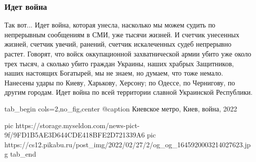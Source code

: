  
 
 
 
 

\subsubsection{Идет война}

Так вот... Идет война, которая унесла, насколько мы можем судить по непрерывным
сообщениям в СМИ, уже тысячи жизней. И счетчик унесенных жизней, счетчик
увечий, ранений, счетчик искалеченных судеб непрерывно растет. Говорят, что
войск оккупационной захватнической армии убито уже около трех тысяч, а сколько
убито граждан Украины, наших храбрых Защитников, наших настоящих Богатырей, мы
не знаем, но думаем, что тоже немало. Нанесены удары по Киеву, Харькову,
Херсону; по Одессе, по Чернигову, по другим городам. Идет война по всей
территории славной Украинской Республики.

\ifcmt
  tab_begin cols=2,no_fig,center
		 @caption Киевское метро, Киев, война, 2022

		 pic https://storage.myseldon.com/news-pict-9f/9FD1B5AE3D644CDE418BFE2D721339A6
     pic https://cs12.pikabu.ru/post_img/2022/02/27/2/og_og_1645920003214027623.jpg
  tab_end
\fi

